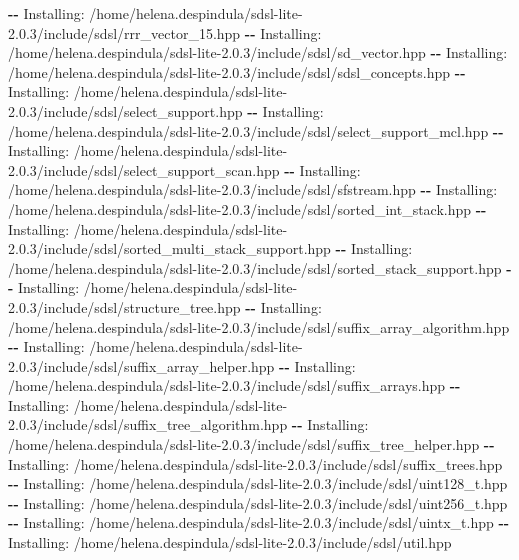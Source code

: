 \documentclass[
]{article}
\newenvironment{Shaded}{\begin{snugshade}}{\end{snugshade}}
\newcommand{\ExtensionTok}[1]{\textcolor[rgb]{0.00,0.60,1.00}{\textbf{#1}}}
\newcommand{\NormalTok}[1]{\textcolor[rgb]{0.81,0.81,0.76}{#1}}
\begin{document}
\begin{Shaded}
\begin{Highlighting}[]
\ExtensionTok{{-}{-}}\NormalTok{ Installing: /home/helena.despindula/sdsl{-}lite{-}2.0.3/include/sdsl/rrr\_vector\_15.hpp}
\ExtensionTok{{-}{-}}\NormalTok{ Installing: /home/helena.despindula/sdsl{-}lite{-}2.0.3/include/sdsl/sd\_vector.hpp}
\ExtensionTok{{-}{-}}\NormalTok{ Installing: /home/helena.despindula/sdsl{-}lite{-}2.0.3/include/sdsl/sdsl\_concepts.hpp}
\ExtensionTok{{-}{-}}\NormalTok{ Installing: /home/helena.despindula/sdsl{-}lite{-}2.0.3/include/sdsl/select\_support.hpp}
\ExtensionTok{{-}{-}}\NormalTok{ Installing: /home/helena.despindula/sdsl{-}lite{-}2.0.3/include/sdsl/select\_support\_mcl.hpp}
\ExtensionTok{{-}{-}}\NormalTok{ Installing: /home/helena.despindula/sdsl{-}lite{-}2.0.3/include/sdsl/select\_support\_scan.hpp}
\ExtensionTok{{-}{-}}\NormalTok{ Installing: /home/helena.despindula/sdsl{-}lite{-}2.0.3/include/sdsl/sfstream.hpp}
\ExtensionTok{{-}{-}}\NormalTok{ Installing: /home/helena.despindula/sdsl{-}lite{-}2.0.3/include/sdsl/sorted\_int\_stack.hpp}
\ExtensionTok{{-}{-}}\NormalTok{ Installing: /home/helena.despindula/sdsl{-}lite{-}2.0.3/include/sdsl/sorted\_multi\_stack\_support.hpp}
\ExtensionTok{{-}{-}}\NormalTok{ Installing: /home/helena.despindula/sdsl{-}lite{-}2.0.3/include/sdsl/sorted\_stack\_support.hpp}
\ExtensionTok{{-}{-}}\NormalTok{ Installing: /home/helena.despindula/sdsl{-}lite{-}2.0.3/include/sdsl/structure\_tree.hpp}
\ExtensionTok{{-}{-}}\NormalTok{ Installing: /home/helena.despindula/sdsl{-}lite{-}2.0.3/include/sdsl/suffix\_array\_algorithm.hpp}
\ExtensionTok{{-}{-}}\NormalTok{ Installing: /home/helena.despindula/sdsl{-}lite{-}2.0.3/include/sdsl/suffix\_array\_helper.hpp}
\ExtensionTok{{-}{-}}\NormalTok{ Installing: /home/helena.despindula/sdsl{-}lite{-}2.0.3/include/sdsl/suffix\_arrays.hpp}
\ExtensionTok{{-}{-}}\NormalTok{ Installing: /home/helena.despindula/sdsl{-}lite{-}2.0.3/include/sdsl/suffix\_tree\_algorithm.hpp}
\ExtensionTok{{-}{-}}\NormalTok{ Installing: /home/helena.despindula/sdsl{-}lite{-}2.0.3/include/sdsl/suffix\_tree\_helper.hpp}
\ExtensionTok{{-}{-}}\NormalTok{ Installing: /home/helena.despindula/sdsl{-}lite{-}2.0.3/include/sdsl/suffix\_trees.hpp}
\ExtensionTok{{-}{-}}\NormalTok{ Installing: /home/helena.despindula/sdsl{-}lite{-}2.0.3/include/sdsl/uint128\_t.hpp}
\ExtensionTok{{-}{-}}\NormalTok{ Installing: /home/helena.despindula/sdsl{-}lite{-}2.0.3/include/sdsl/uint256\_t.hpp}
\ExtensionTok{{-}{-}}\NormalTok{ Installing: /home/helena.despindula/sdsl{-}lite{-}2.0.3/include/sdsl/uintx\_t.hpp}
\ExtensionTok{{-}{-}}\NormalTok{ Installing: /home/helena.despindula/sdsl{-}lite{-}2.0.3/include/sdsl/util.hpp}

\end{Highlighting}
\end{Shaded}
\end{document}
